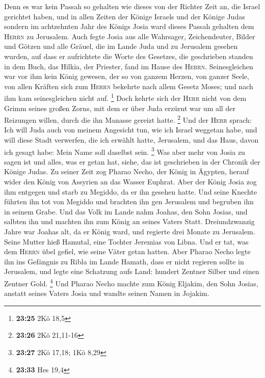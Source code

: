  Denn es war kein Passah so gehalten wie dieses von der
Richter Zeit an, die Israel gerichtet haben, und in allen Zeiten der
Könige Israels und der Könige Judas  sondern im
achtzehnten Jahr des Königs Josia ward dieses Passah gehalten dem
\textsc{Herrn} zu Jerusalem.  Auch fegte Josia aus alle
Wahrsager, Zeichendeuter, Bilder und Götzen und alle Gräuel, die im
Lande Juda und zu Jerusalem gesehen wurden, auf dass er aufrichtete die
Worte des Gesetzes, die geschrieben standen in dem Buch, das Hilkia, der
Priester, fand im Hause des \textsc{Herrn}. 
Seinesgleichen war vor ihm kein König gewesen, der so von ganzem Herzen,
von ganzer Seele, von allen Kräften sich zum \textsc{Herrn} bekehrte
nach allem Gesetz Moses; und nach ihm kam seinesgleichen nicht auf.
\footnote{\textbf{23:25} 2Kö 18,5}  Doch kehrte sich der
\textsc{Herr} nicht von dem Grimm seines großen Zorns, mit dem er über
Juda erzürnt war um all der Reizungen willen, durch die ihn Manasse
gereizt hatte. \footnote{\textbf{23:26} 2Kö 21,11-16} 
Und der \textsc{Herr} sprach: Ich will Juda auch von meinem Angesicht
tun, wie ich Israel weggetan habe, und will diese Stadt verwerfen, die
ich erwählt hatte, Jerusalem, und das Haus, davon ich gesagt habe: Mein
Name soll daselbst sein. \footnote{\textbf{23:27} 2Kö 17,18; 1Kö 8,29}
 Was aber mehr von Josia zu sagen ist und alles, was er
getan hat, siehe, das ist geschrieben in der Chronik der Könige Judas.
 Zu seiner Zeit zog Pharao Necho, der König in Ägypten,
herauf wider den König von Assyrien an das Wasser Euphrat. Aber der
König Josia zog ihm entgegen und starb zu Megiddo, da er ihn gesehen
hatte.  Und seine Knechte führten ihn tot von Megiddo und
brachten ihn gen Jerusalem und begruben ihn in seinem Grabe. Und das
Volk im Lande nahm Joahas, den Sohn Josias, und salbten ihn und machten
ihn zum König an seines Vaters Statt.  Dreiundzwanzig
Jahre war Joahas alt, da er König ward, und regierte drei Monate zu
Jerusalem. Seine Mutter hieß Hamutal, eine Tochter Jeremias von Libna.
 Und er tat, was dem \textsc{Herrn} übel gefiel, wie
seine Väter getan hatten.  Aber Pharao Necho legte ihn
ins Gefängnis zu Ribla im Lande Hamath, dass er nicht regieren sollte in
Jerusalem, und legte eine Schatzung aufs Land: hundert Zentner Silber
und einen Zentner Gold. \footnote{\textbf{23:33} Hes 19,4}
 Und Pharao Necho machte zum König Eljakim, den Sohn
Josias, anstatt seines Vaters Josia und wandte seinen Namen in Jojakim.
